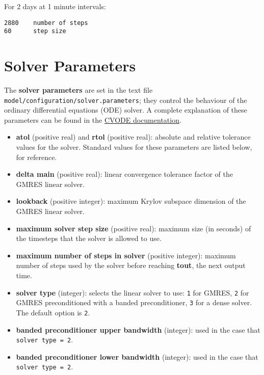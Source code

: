 For 2 days at 1 minute intervals:

\begin{verbatim}
2880    number of steps
60      step size
\end{verbatim}

\section{Solver Parameters} \label{sec:solver}

The \textbf{solver parameters} are set in the text file
\texttt{model/configuration/solver.parameters}; they control the
behaviour of the ordinary differential equations (ODE) solver. A
complete explanation of these parameters can be found in the
\href{https://computation.llnl.gov/projects/sundials/sundials-software}{CVODE
  documentation}.

\begin{itemize}
\item \textbf{atol} (positive real) and \textbf{rtol} (positive real):
  absolute and relative tolerance values for the solver. Standard
  values for these parameters are listed below, for reference.
\item \textbf{delta main} (positive real): linear convergence
  tolerance factor of the GMRES linear solver.
\item \textbf{lookback} (positive integer): maximum Krylov subspace
  dimension of the GMRES linear solver.
\item \textbf{maximum solver step size} (positive real): maximum size
  (in seconds) of the timesteps that the solver is allowed to use.
\item \textbf{maximum number of steps in solver} (positive integer):
  maximum number of steps used by the solver before reaching
  \textbf{tout}, the next output time.
\item \textbf{solver type} (integer): selects the linear solver to
  use: \texttt{1} for GMRES, \texttt{2} for GMRES preconditioned with
  a banded preconditioner, \texttt{3} for a dense solver. The default
  option is \texttt{2}.
\item \textbf{banded preconditioner upper bandwidth} (integer): used
  in the case that \texttt{solver\ type\ =\ 2}.
\item \textbf{banded preconditioner lower bandwidth} (integer): used
  in the case that \texttt{solver\ type\ =\ 2}.
\end{itemize}

